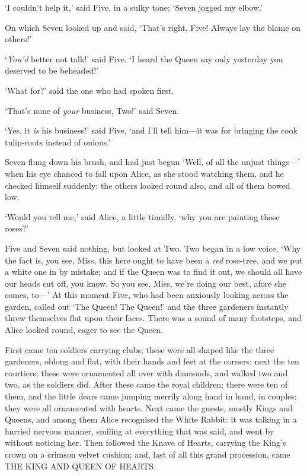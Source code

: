 \documentclass[12pt,openany]{memoir}
\begin{document}
`I couldn't help it,' said Five, in a sulky tone; `Seven jogged my elbow.'

On which Seven looked up and said, `That's right, Five! Always lay the blame on others!'

`\textit{You'd} better not talk!' said Five. `I heard the Queen say only yesterday you deserved to be beheaded!'

`What for?' said the one who had spoken first.

`That's none of \textit{your} business, Two!' said Seven.

`Yes, it \textit{is} his business!' said Five, `and I'll tell him---it was for bringing the cook tulip-roots instead of onions.'

Seven flung down his brush, and had just begun `Well, of all the unjust things---' when his eye chanced to fall upon Alice, as she stood watching them, and he checked himself suddenly: the others looked round also, and all of them bowed low.

`Would you tell me,' said Alice, a little timidly, `why you are painting those roses?'

Five and Seven said nothing, but looked at Two. Two began in a low voice, `Why the fact is, you see, Miss, this here ought to have been a \textit{red} rose-tree, and we put a white one in by mistake; and if the Queen was to find it out, we should all have our heads cut off, you know. So you see, Miss, we're doing our best, afore she comes, to---' At this moment Five, who had been anxiously looking across the garden, called out `The Queen! The Queen!' and the three gardeners instantly threw themselves flat upon their faces. There was a sound of many footsteps, and Alice looked round, eager to see the Queen.

First came ten soldiers carrying clubs; these were all shaped like the three gardeners, oblong and flat, with their hands and feet at the corners: next the ten courtiers; these were ornamented all over with diamonds, and walked two and two, as the soldiers did. After these came the royal children; there were ten of them, and the little dears came jumping merrily along hand in hand, in couples: they were all ornamented with hearts. Next came the guests, mostly Kings and Queens, and among them Alice recognised the White Rabbit: it was talking in a hurried nervous manner, smiling at everything that was said, and went by without noticing her. Then followed the Knave of Hearts, carrying the King's crown on a crimson velvet cushion; and, last of all this grand procession, came THE KING AND QUEEN OF HEARTS.
\end{document}
